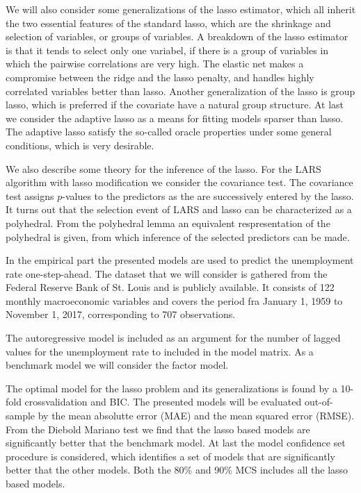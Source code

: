 We will also consider some generalizations of the lasso estimator, which all inherit the two essential features of the standard lasso, which are the shrinkage and selection of variables, or groups of variables.
A breakdown of the lasso estimator is that it tends to select only one variabel, if there is a group of variables in which the pairwise correlations are very high.
The elastic net makes a compromise between the ridge and the lasso penalty, and handles highly correlated variables better than lasso. 
Another generalization of the lasso is group lasso, which is preferred if the covariate have a natural group structure.
At last we consider the adaptive lasso as a means for fitting models sparser than lasso.
The adaptive lasso satisfy the so-called oracle properties under some general conditions, which is very desirable. 

We also describe some theory for the inference of the lasso.
For the LARS algorithm with lasso modification we consider the covariance test.
The covariance test assigns \(p\)-values to the predictors as the are successively entered by the lasso.
It turns out that the selection event of LARS and lasso can be characterized as a polyhedral.
From the polyhedral lemma an equivalent respresentation of the polyhedral is given, from which inference of the selected predictors can be made.

In the empirical part the presented models are used to predict the unemployment rate one-step-ahead.
The dataset that we will consider is gathered from the Federal Reserve Bank of St. Louis and is publicly available.
It consists of 122 monthly macroeconomic variables and covers the period fra January 1, 1959 to November 1, 2017, corresponding to 707 observations.

The autoregressive model is included as an argument for the number of lagged values for the unemployment rate to included in the model matrix.
As a benchmark model we will consider the factor model.

The optimal model for the lasso problem and its generalizations is found by a 10-fold crossvalidation and BIC.
The presented models will be evaluated out-of-sample by the mean absolutte error (MAE) and the mean squared error (RMSE).
From the Diebold Mariano test we find that the lasso based models are significantly better that the benchmark model. 
At last the model confidence set procedure is considered, which identifies a set of models that are significantly better that the other models.
Both the 80\% and 90\% MCS includes all the lasso based models.